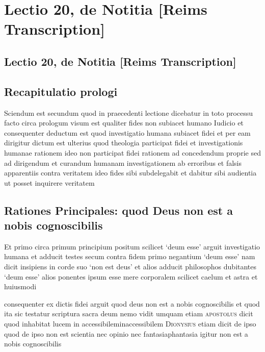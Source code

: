 \documentclass[twoside, openright]{report}
\newcommand{\name}[1]{\textsc{#1}}
\begin{document}
        \chapter*{Lectio 20, de Notitia [Reims Transcription]}
        
         
        \beginnumbering
         \section*{Lectio 20, de Notitia [Reims Transcription]} 
        \bigskip
         \section*{Recapitulatio prologi} 
        \pstart
        Sciendum est secundum quod in praecedenti lectione dicebatur in toto processu facto circa prologum visum est qualiter fides non subiacet humano Iudicio  et consequenter deductum est quod investigatio humana subiacet fidei et per eam dirigitur dictum est ulterius quod theologia participat fidei et investigationis humanae rationem ideo non participat fidei rationem ad concedendum proprie sed ad dirigendum et curandum humanam investigationem ab erroribus et falsis apparentiis contra veritatem ideo fides sibi subdelegabit et dabitur sibi audientia ut posset inquirere veritatem
        \pend
      
        \bigskip
         \section*{Rationes Principales: quod Deus non est a nobis cognoscibilis} 
        \bigskip
         
        \pstart
        Et primo circa primum principium positum scilicet \enquote*{deum esse} arguit investigatio humana et adducit testes secum contra fidem primo negantium \enquote*{deum esse} nam dicit insipiens in corde suo \enquote*{non est deus} et alios adducit philosophos dubitantes \enquote*{deum esse}  alios ponentes ipsum esse mere corporalem scilicet caelum et astra et huiusmodi
        \pend
     
        \pstart
        consequenter ex dictis fidei arguit quod deus non est a nobis cognoscibilis et quod ita sic testatur scriptura sacra deum nemo vidit umquam etiam \name{apostolus} dicit quod inhabitat lucem in accessibileminaccessibilem  \name{Dionysius} etiam dicit de ipso quod de ipso non est scientia nec opinio nec fantasiaphantasia igitur non est a nobis cognoscibilis
        \pend
      
\end{document}
